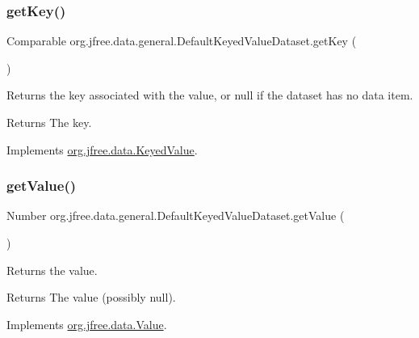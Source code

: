 \subsubsection{\texorpdfstring{get\+Key()}{getKey()}}
{\footnotesize\ttfamily Comparable org.\+jfree.\+data.\+general.\+Default\+Keyed\+Value\+Dataset.\+get\+Key (\begin{DoxyParamCaption}{ }\end{DoxyParamCaption})}

Returns the key associated with the value, or {\ttfamily null} if the dataset has no data item.

\begin{DoxyReturn}{Returns}
The key. 
\end{DoxyReturn}


Implements \mbox{\hyperlink{interfaceorg_1_1jfree_1_1data_1_1_keyed_value_a82fdfea065ff97bd253b44bb89069970}{org.\+jfree.\+data.\+Keyed\+Value}}.

\mbox{\label{classorg_1_1jfree_1_1data_1_1general_1_1_default_keyed_value_dataset_af2554d604d08db7255c29290c009bb6c}} 
\subsubsection{\texorpdfstring{get\+Value()}{getValue()}}
{\footnotesize\ttfamily Number org.\+jfree.\+data.\+general.\+Default\+Keyed\+Value\+Dataset.\+get\+Value (\begin{DoxyParamCaption}{ }\end{DoxyParamCaption})}

Returns the value.

\begin{DoxyReturn}{Returns}
The value (possibly {\ttfamily null}). 
\end{DoxyReturn}


Implements \mbox{\hyperlink{interfaceorg_1_1jfree_1_1data_1_1_value_a70e7f25d71cbb7eb0cdad970adcfe4b9}{org.\+jfree.\+data.\+Value}}.

\mbox{\label{classorg_1_1jfree_1_1data_1_1general_1_1_default_keyed_value_dataset_a9c9504395a1ac30ad81b5ecebe4fa34b}} 
